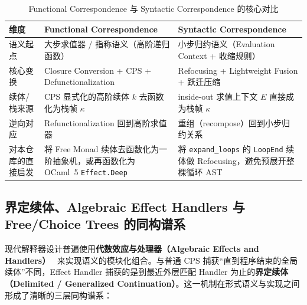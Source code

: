 \documentclass[UTF8,a4paper,11pt,fontset=fandol]{ctexart}
\newcommand{\code}[1]{\texttt{#1}}
\begin{document}
\begin{table}[htbp]
\centering
\caption{Functional Correspondence 与 Syntactic Correspondence 的核心对比}
\label{tab:danvy-correspondence}
\begin{tabularx}{\linewidth}{@{}lYY@{}}
\toprule
维度 & Functional Correspondence~\cite{ager2003functional} & Syntactic Correspondence~\cite{danvy2004refocusing} \\
\midrule
语义起点 & 大步求值器 / 指称语义（高阶递归函数） & 小步归约语义（Evaluation Context + 收缩规则） \\
核心变换 & Closure Conversion + CPS + Defunctionalization & Refocusing + Lightweight Fusion + 跃迁压缩 \\
续体/栈来源 & CPS 显式化的高阶续体 $k$ 去函数化为栈帧 $\kappa$ & inside-out 求值上下文 $E$ 直接成为栈帧 $\kappa$ \\
逆向对应 & Refunctionalization 回到高阶求值器~\cite{danvy2009refunc} & 重组（recompose）回到小步归约关系 \\
对本仓库的直接启发 & 将 Free Monad 续体去函数化为一阶抽象机，或再函数化为 OCaml~5 \code{Effect.Deep} & 将 \code{expand\_loops} 的 \code{LoopEnd} 续体做 Refocusing，避免预展开整棵循环 AST \\
\bottomrule
\end{tabularx}
\end{table}

\subsection{界定续体、Algebraic Effect Handlers 与 Free/Choice Trees 的同构谱系}

现代解释器设计普遍使用\textbf{代数效应与处理器（Algebraic Effects and Handlers）}~\cite{plotkin2009handlers} 来实现语义的模块化组合。与普通 CPS 捕获“直到程序结束的全局续体”不同，Effect Handler 捕获的是到最近外层匹配 Handler 为止的\textbf{界定续体（Delimited / Generalized Continuation）}。这一机制在形式语义与实现之间形成了清晰的三层同构谱系：
\end{document}
